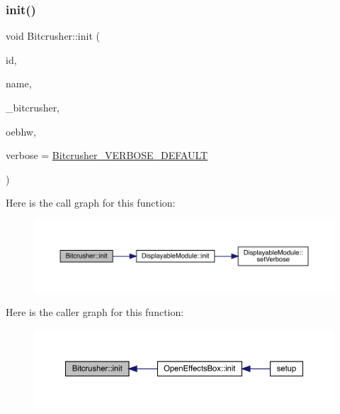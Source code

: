 \subsubsection{\texorpdfstring{init()}{init()}}
{\footnotesize\ttfamily void Bitcrusher\+::init (\begin{DoxyParamCaption}\item[{int}]{id,  }\item[{char $\ast$}]{name,  }\item[{Audio\+Effect\+Bitcrusher $\ast$}]{\+\_\+bitcrusher,  }\item[{\mbox{\hyperlink{class_open_effects_box_h_w}{Open\+Effects\+Box\+HW}} $\ast$}]{oebhw,  }\item[{int}]{verbose = {\ttfamily \mbox{\hyperlink{_bitcrusher_8h_a11f2932e6b24f27a8025c6bfe4e234c0}{Bitcrusher\+\_\+\+V\+E\+R\+B\+O\+S\+E\+\_\+\+D\+E\+F\+A\+U\+LT}}} }\end{DoxyParamCaption})}

Here is the call graph for this function\+:\nopagebreak
\begin{figure}[H]
\begin{center}
\leavevmode
\includegraphics[width=350pt]{class_bitcrusher_a8d46a549db08c6c022c55f10b348647d_cgraph}
\end{center}
\end{figure}
Here is the caller graph for this function\+:\nopagebreak
\begin{figure}[H]
\begin{center}
\leavevmode
\includegraphics[width=350pt]{class_bitcrusher_a8d46a549db08c6c022c55f10b348647d_icgraph}
\end{center}
\end{figure}
\mbox{\label{class_bitcrusher_ae392ad4b140a5121df417ece060911f4}} 
